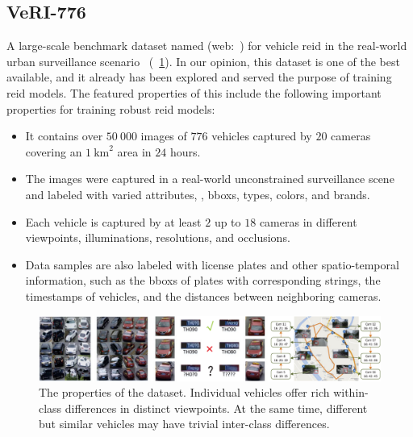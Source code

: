 \subsection{VeRI-776}
\label{ssec:DatasetVeRI776}

A large-scale benchmark dataset named \verisss{} (web:~\cite{webveridataset}) for vehicle \gls{reid} in the real-world urban surveillance scenario~\cite{liu2018provid} (\figtext{}~\ref{fig:VeRI776Dataset}). In our opinion, this dataset is one of the best available, and it already has been explored and served the purpose of training \gls{reid} models. The featured properties of this include the following important properties for training robust \gls{reid} models:

\begin{itemize}
    \item It contains over $50\ 000$ images of $776$ vehicles captured by $20$ cameras covering an $1\  \text{km}^2$ area in $24$ hours.
    \item The images were captured in a real-world unconstrained surveillance scene and labeled with varied attributes, \egtext{}, \glspl{bbox}, types, colors, and brands.
    \item Each vehicle is captured by at least $2$ up to $18$ cameras in different viewpoints, illuminations, resolutions, and occlusions.
    \item Data samples are also labeled with license plates and other spatio-temporal information, such as the \glspl{bbox} of plates with corresponding strings, the timestamps of vehicles, and the distances between neighboring cameras.
\end{itemize}

\begin{figure}[t]
    \centerline{\includegraphics[width=\linewidth]{figures/datasets/veri776__overview.pdf}}
    \caption[\verisss{} dataset]{The properties of the \verisss{} dataset. Individual vehicles offer rich within-class differences in distinct viewpoints. At the same time, different but similar vehicles may have trivial inter-class differences. }
    \label{fig:VeRI776Dataset}
\end{figure}
